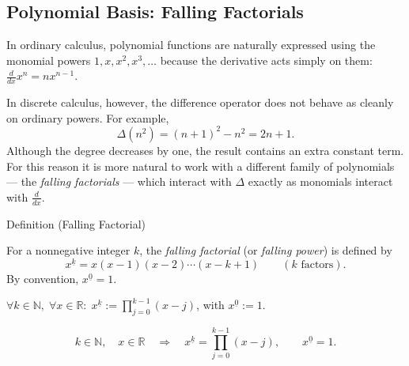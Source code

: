
\subsection{Polynomial Basis: Falling Factorials}
\label{sec:falling-factorials}

\begin{exposition}
In ordinary calculus, polynomial functions are naturally expressed using
the monomial powers \(1, x, x^2, x^3, \dots\) because the derivative
acts simply on them: \(\tfrac{d}{dx} x^n = n x^{n-1}\).

In discrete calculus, however, the difference operator does not behave
as cleanly on ordinary powers. For example,
\[
\Delta(n^2) = (n+1)^2 - n^2 = 2n + 1.
\]
Although the degree decreases by one, the result contains an extra
constant term. For this reason it is more natural to work with a
different family of polynomials --- the \emph{falling factorials} ---
which interact with \(\Delta\) exactly as monomials interact with
\(\tfrac{d}{dx}\).
\end{exposition}

\begin{definitionbox}{Definition (Falling Factorial)}
\begin{definition}
\label{def:falling-factorial}
For a nonnegative integer \(k\), the \emph{falling factorial} (or
\emph{falling power}) is defined by
\[
x^{\underline{k}} = x(x-1)(x-2)\cdots(x-k+1)
\qquad (k \text{ factors}).
\]
By convention, \(x^{\underline{0}} = 1\).
\end{definition}
\end{definitionbox}

\begin{remark*}
\(\forall k \in \mathbb{N},\; \forall x \in \mathbb{R}:\;
x^{\underline{k}} := \displaystyle\prod_{j=0}^{k-1}(x-j)\),
with \(x^{\underline{0}} := 1\).
\end{remark*}

\begin{remark*}
\[
  k\in\mathbb{N},\quad x\in\mathbb{R}
  \quad\Longrightarrow\quad
  x^{\underline{k}}=\prod_{j=0}^{k-1}(x-j),\qquad x^{\underline{0}}=1.
\]
\end{remark*}

